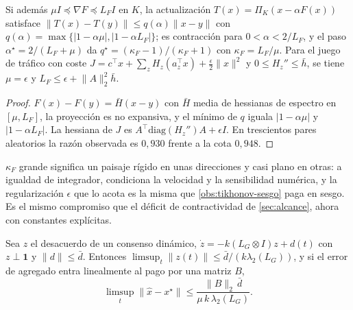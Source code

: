 \begin{proposicion}
\label{pr:contraccion-proyectada}
Si además $\mu I\preceq\nabla F\preceq L_FI$ en $K$, la actualización
$T(x)=\Pi_K(x-\alpha F(x))$ satisface
$\lVert T(x)-T(y)\rVert\le q(\alpha)\lVert x-y\rVert$ con
$q(\alpha)=\max\{|1-\alpha\mu|,|1-\alpha L_F|\}$; es contracción para
$0<\alpha<2/L_F$, y el paso $\alpha^\star=2/(L_F+\mu)$ da
$q^\star=(\kappa_F-1)/(\kappa_F+1)$ con $\kappa_F=L_F/\mu$. Para el juego de
tráfico con coste $J=c^{\!\top}x+\sum_zH_z(a_z^{\!\top}x)+\tfrac\epsilon2\lVert x\rVert^2$
y $0\le H_z''\le\bar h$, se tiene $\mu=\epsilon$ y $L_F\le\epsilon+\lVert A\rVert_2^2\bar h$.
\end{proposicion}

\begin{proof}
$F(x)-F(y)=\bar H(x-y)$ con $\bar H$ media de hessianas de espectro en
$[\mu,L_F]$, la proyección es no expansiva, y el mínimo de $q$ iguala
$|1-\alpha\mu|$ y $|1-\alpha L_F|$. La hessiana de $J$ es
$A^{\!\top}\mathrm{diag}(H_z'')A+\epsilon I$. En trescientos pares aleatorios
la razón observada es $0{,}930$ frente a la cota $0{,}948$.
\end{proof}

\begin{observacion}
\label{obs:condicion-estrategica}
$\kappa_F$ grande significa un paisaje rígido en unas direcciones y casi plano
en otras: a igualdad de integrador, condiciona la velocidad y la sensibilidad
numérica, y la regularización $\epsilon$ que lo acota es la misma que
\cref{obs:tikhonov-sesgo} paga en sesgo. Es el mismo compromiso que el
déficit de contractividad de \cref{sec:alcance}, ahora con constantes
explícitas.
\end{observacion}

\begin{proposicion}
\label{pr:seguimiento-conectividad}
Sea $z$ el desacuerdo de un consenso dinámico,
$\dot z=-k(L_G\otimes I)z+d(t)$ con $z\perp\mathbf 1$ y
$\lVert d\rVert\le\bar d$. Entonces
$\limsup_t\lVert z(t)\rVert\le\bar d/(k\lambda_2(L_G))$, y si el error de
agregado entra linealmente al pago por una matriz $B$,
\begin{equation}
  \label{eq:conectividad-decision}
  \limsup_t\lVert\hat x-x^\star\rVert\le\frac{\lVert B\rVert_2\,\bar d}{\mu\,k\,\lambda_2(L_G)} .
\end{equation}
\end{proposicion}

